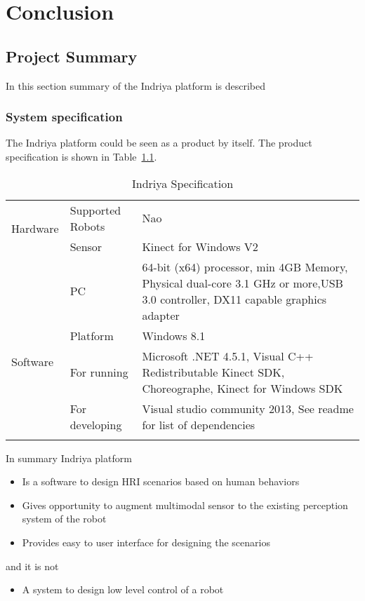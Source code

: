
\chapter{Conclusion} %
\label{Chapter7} %
\section{Project Summary}
In this section summary of the Indriya platform is described
\subsection{System specification}
 The Indriya platform could be seen as a product by itself. The product specification is shown in Table~\ref{table:system}.
\begin{table}
\centering
\caption{Indriya Specification}
\label{table:system}
\begin{tabularx}{\textwidth}{X X X}
\toprule
  \multirow{2}{*}{Hardware} & Supported Robots & Nao \\
                            & Sensor & Kinect for Windows V2 \\
                            & PC & 64-bit (x64) processor, min 4GB Memory, Physical dual-core 3.1 GHz or more,USB 3.0 controller, DX11 capable graphics adapter\\
                                          \toprule                                       
  \multirow{2}{*}{Software} & Platform & Windows 8.1  \\
                            & For running & Microsoft .NET 4.5.1, Visual C++ Redistributable Kinect SDK, Choreographe, Kinect for Windows SDK \\
                            & For developing & Visual studio community 2013, See readme for list of dependencies \\
                                          \tabularnewline\toprule
\end{tabularx}
\end{table}
In summary Indriya platform
\begin{itemize}
\item Is a software to design HRI scenarios based on human behaviors
\item Gives opportunity to augment multimodal sensor to the existing perception system of the robot
\item Provides easy to user interface for designing the scenarios
\end{itemize}
and it is not
\begin{itemize}
\item A system to design low level control of a robot
\end{itemize}
	
